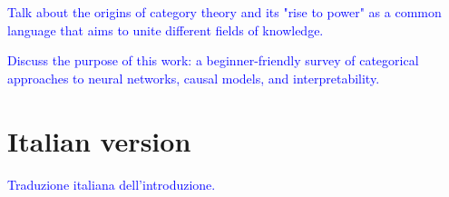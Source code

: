 \documentclass[12pt,a4paper,openright,twoside]{report}
\theoremstyle{plain}
\theoremstyle{definition}
\begin{document}
  \textcolor{blue}{Talk about the origins of category theory and its "rise to power" as a common language that aims to unite different fields of knowledge.}
    
  \textcolor{blue}{Discuss the purpose of this work: a beginner-friendly survey of categorical approaches to neural networks, causal models, and interpretability.}


  \section*{Italian version}

  \textcolor{blue}{Traduzione italiana dell'introduzione.}


\clearpage{\pagestyle{empty}\cleardoublepage}





















































\end{document}
